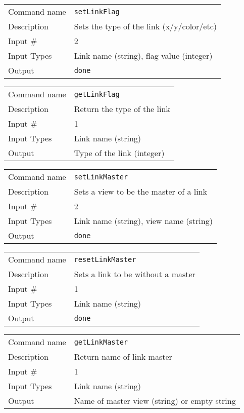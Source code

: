 \bigskip

\noindent
\begin{tabular}{l|p{5in}}
\hline
Command name & {\tt setLinkFlag} \\
Description  & Sets the type of the link (x/y/color/etc) \\
Input \#     & 2 \\
Input Types  & Link name (string), flag value (integer) \\
Output       & {\tt done} \\
\hline
\end{tabular}

\bigskip

\noindent
\begin{tabular}{l|p{5in}}
\hline
Command name & {\tt getLinkFlag} \\
Description  & Return the type of the link \\
Input \#     & 1 \\
Input Types  & Link name (string) \\
Output       & Type of the link (integer) \\
\hline
\end{tabular}

\bigskip

\noindent
\begin{tabular}{l|p{5in}}
\hline
Command name & {\tt setLinkMaster} \\
Description  & Sets a view to be the master of a link \\
Input \#     & 2 \\
Input Types  & Link name (string), view name (string) \\
Output       & {\tt done} \\
\hline
\end{tabular}

\bigskip

\noindent
\begin{tabular}{l|p{5in}}
\hline
Command name & {\tt resetLinkMaster} \\
Description  & Sets a link to be without a master \\
Input \#     & 1 \\
Input Types  & Link name (string) \\
Output       & {\tt done} \\
\hline
\end{tabular}

\bigskip

\noindent
\begin{tabular}{l|p{5in}}
\hline
Command name & {\tt getLinkMaster} \\
Description  & Return name of link master \\
Input \#     & 1 \\
Input Types  & Link name (string) \\
Output       & Name of master view (string) or empty string \\
\hline
\end{tabular}

